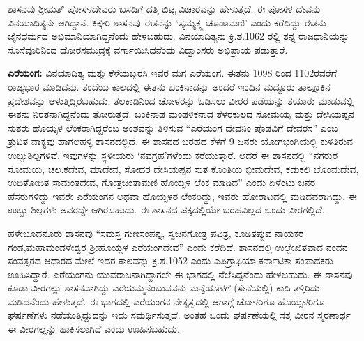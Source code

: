 ಶಾಸನವು ಶ‍್ರೀಮತ್​ ಪೋಸಳದೇವರು ಬಸದಿಗೆ ದತ್ತಿ ಬಿಟ್ಟ ವಿಚಾರವನ್ನು ಹೇಳುತ್ತದೆ. ಈ ಪೋಸಳ ದೇವನು ವಿನಯಾದಿತ್ಯನೇ ಆಗಿದ್ದಾನೆ. ಕಿಕ್ಕೇರಿ ಶಾಸನವು ಈತನನ್ನು ‘ಸ್ಯಮ್ಯಕ್ತ್ವ ಚೂಡಾಮಣಿ’ ಎಂದು ಕರೆದಿದ್ದು ಈತನು ಜೈನಧರ್ಮದ ಅಭಿಮಾನಿಯಾಗಿದ್ದನೆಂದು ಹೇಳಬಹುದು. ವಿನಯಾದಿತ್ಯನು ಕ್ರಿ.ಶ.1062 ರಲ್ಲಿ ತನ್ನ ರಾಜಧಾನಿಯನ್ನು ಸೊಸೆವೂರಿನಿಂದ ದೋರಸಮುದ್ರಕ್ಕೆ ವರ್ಗಾಯಿಸಿದನೆಂದು ವಿದ್ವಾಂಸರು ಅಭಿಪ್ರಾಯ ಪಡುತ್ತಾರೆ.

\textbf{ಎರೆಯಂಗ:} ವಿನಯಾದಿತ್ಯ ಮತ್ತು ಕೆಳೆಯಬ್ಬರಸಿ ಇವರ ಮಗ ಎರೆಯಂಗ. ಈತನು 1098 ರಿಂದ 1102ರವರೆಗೆ ರಾಜ್ಯಭಾರ ಮಾಡಿದನು. ತಂದೆಯ ಕಾಲದಲ್ಲಿ ಈತನು ಬಂಕಿನಾಡನ್ನು ಅಂದರೆ ಇಂದಿನ ಮದ್ದೂರು ತಾಲ್ಲೂಕಿನ ಪ್ರದೇಶವನ್ನು ಆಳುತ್ತಿದ್ದಿರಬಹುದು. ತಲಕಾಡಿನಿಂದ ಚೋಳರನ್ನು ಓಡಿಸಲು ವೀರರ ಪಡೆಯನ್ನು ತಯಾರು ಮಾಡುವಲ್ಲಿ ಈತನು ನಿರತನಾಗಿದ್ದನೆಂದು ತೋರುತ್ತದೆ. ಬಂಕಿನಾಡ ಮಂಡಳಿಕನಾದ ತೆಳರಕುಲದ ಸೋಮಯ್ಯ ಮತ್ತು ದೇಸಿಯಪ್ಪನ ಸುತರು ಹೊಯ್ಸಳ ಲೆಂಕರಾಗಿದ್ದರೆಂಬ ಅಂಶವನ್ನು ತಿಳಿಸುವ “ಎರೆಯಂಗ ದೇವನಿಂ ಪೊಡವಿಗೆ ದೇವರಸ” ಎಂಬ ತ್ರುಟಿತ ವಾಕ್ಯವು ಹಾಗಲಹಳ್ಳಿ ಶಾಸನದಲ್ಲಿದೆ. ಈ ಶಾಸನದ ಬರಹದ ಕೆಳಗೆ 9 ಜನರು ಯೋಗಭಂಗಿಯಲ್ಲಿ ಕುಳಿತಿರುವ ಉಬ್ಬುಶಿಲ್ಪಗಳಿವೆ. ಇವುಗಳನ್ನು ಸ್ಥಳೀಯರು ‘ನವಗ್ರಹ’ಗಳೆಂದು ಕರೆಯುತ್ತಾರೆ. ಆದರೆ ಈ ಶಾಸನದಲ್ಲಿ “ನಗರುರ ಸೋಮಯ, ಚಲ.ಕದೇವ, ಮಾದೇವ, ಸೋದರ ದೇಸಿಯಪ್ಪನ ಸುತ ಕೊಂತಿಯ ಭೀಮದೇವ, ಕಡುಕಲಿ ಬೊಂಮದೇವ, ಉದಿತೋದಿತ ಸಾಮಂತದೇವ, ಗೋತ್ರಚಿಂತಾಮಣಿ ಹೊಯ್ಸಳ ಲೆಂಕ ಮಾಡಿದ” ಎಂದು ಏಳೆಂಟು ಜನರ ಹೆಸರುಗಳಿದ್ದು ಇವರೇ ಎರೆಯಂಗನ ಅಥವಾ ಹೊಯ್ಸಳರ ಲೆಂಕರಿದ್ದು, ಇವರು ಹೋರಾಟದಲ್ಲಿ ಮಡಿದವರಾಗಿದ್ದು, ಈ ಉಬ್ಬು ಶಿಲ್ಪಗಳು ಅವರದ್ದೇ ಆಗಿರಬಹುದು. ಈ ಶಾಸನದ ಪಕ್ಕದಲ್ಲಿಯೇ ಬರಹವಿಲ್ಲದ ಒಂದು ವೀರಗಲ್ಲಿದೆ.

ಹಳೇಬೂದನೂರು ಶಾಸನವು “ಸಮಸ್ತ ಗುಣಸಂಪನ್ನ, ಸ್ವಜನಗೋತ್ರ ಪವಿತ್ರ, ಕೂಡಿತಪ್ಪುವ ನಾಯಕರ ಗಂಡ,\break ಮಹಾಮಂಡಳೇಶ್ವರ ಶ‍್ರೀಹೊಯ್ಸಳ ಎರೆಯಂಗದೇವ” ಎಂದು ಕರೆದಿದೆ. ಶಾಸನದಲ್ಲಿ ಉಲ್ಲೇಖಿತವಾದ ನಂದನ ಸಂವತ್ಸರದ ಆಧಾರದ ಮೇಲೆ ಇದರ ಕಾಲವನ್ನು ಕ್ರಿ.ಶ.1052 ಎಂದು ಎಪಿಗ್ರಾಫಿಯಾ ಕರ್ನಾಟಿಕಾ ಸಂಪಾದಕರು ಊಹಿಸಿದ್ದಾರೆ. ಎರೆಯಂಗನು ಯುವರಾಜನಾಗಿದ್ದಾಗಲೇ ಈ ಭಾಗದಲ್ಲಿ ನೆಲೆಸಿದ್ದನೆಂದು ಹೇಳಬಹುದು. ಈ ಶಾಸನವು ಕೂಡಾ ವೀರಗಲ್ಲು ಶಾಸನವಾಗಿದ್ದು ಎರೆಯಮ್ಮನೆಂಬುವವನು ಮನ್ನೆಯೊಳಗೆ (ಸೇನೆಯಲ್ಲಿ) ಕಾದಿ ತಳ್ತಿರಿದು ಮಡಿದನೆಂದು ಹೇಳುತ್ತದೆ. ಈ ಭಾಗದಲ್ಲಿ ಎರೆಯಂಗನ ನೇತೃತ್ವದಲ್ಲಿ ಆಗಾಗ್ಗೆ ಚೋಳರಿಗೂ ಹೊಯ್ಸಳರಿಗೂ ಘರ್ಷಣೆಗಳು ನಡೆಯುತ್ತಿದ್ದುದನ್ನು ಇದು ಸಮರ್ಥಿಸುತ್ತದೆ. ಅಂತಹ ಒಂದು ಘರ್ಷಣೆಯಲ್ಲಿ ಸತ್ತ ವೀರನ ಸ್ಮರಣಾರ್ಥ ಈ ವೀರಗಲ್ಲನ್ನು ಹಾಕಿಸಲಾಗಿದೆ ಎಂದು ಊಹಿಸಬಹುದು.

